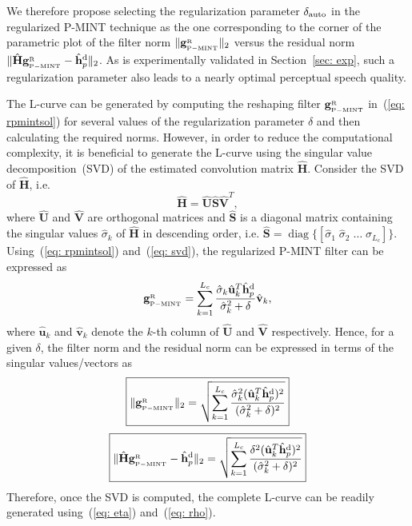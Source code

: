 \documentclass[10pt]{IEEEtran}
\DeclareMathOperator{\diag}{diag}
\begin{document}
We therefore propose selecting the regularization parameter $\delta_{\rm auto}$ in the regularized P-MINT technique as the one corresponding to the corner of the parametric plot of the filter norm $\|\mathbf{g}_{{}_{\rm P-MINT}}^{_{\rm R}}\|_2$ versus the residual norm $\|\hat{\mathbf{H}}\mathbf{g}_{{}_{\rm P-MINT}}^{_{\rm R}} - \hat{\mathbf{h}}_p^{\rm d}\|_2$.
As is experimentally validated in Section~\ref{sec: exp}, such a regularization parameter also leads to a nearly optimal perceptual speech quality.

The L-curve can be generated by computing the reshaping filter $\mathbf{g}_{{}_{\rm P-MINT}}^{_{\rm R}}$ in~(\ref{eq: rpmintsol}) for several values of the regularization parameter $\delta$ and then calculating the required norms.
However, in order to reduce the computational complexity, it is beneficial to generate the L-curve using the singular value decomposition~(SVD) of the estimated convolution matrix $\hat{\mathbf{H}}$.
Consider the SVD of $\hat{\mathbf{H}}$, i.e.
\begin{equation}
\label{eq: svd}
  \hat{\mathbf{H}} = \hat{\mathbf{U}}\hat{\mathbf{S}}\hat{\mathbf{V}}^T,
\end{equation}
where $\hat{\mathbf{U}}$ and $\hat{\mathbf{V}}$ are orthogonal matrices and $\hat{\mathbf{S}}$ is a diagonal matrix containing the singular values $\hat{\sigma}_k$ of $\hat{\mathbf{H}}$ in descending order, i.e. $\hat{\mathbf{S}} = {\diag}\{\left[\hat{\sigma}_1 \; \hat{\sigma}_2 \; \ldots \; \hat{\sigma}_{L_c}\right]\}$.
Using~(\ref{eq: rpmintsol}) and~(\ref{eq: svd}), the regularized P-MINT filter can be expressed as
\begin{equation}
\mathbf{g}_{{}_{\rm P-MINT}}^{_{\rm R}}  =  \sum_{k=1}^{L_c} \frac{\hat{\sigma}_k \hat{\mathbf{u}}_k^T \hat{\mathbf{h}}_p^{\rm d} }{\hat{\sigma}_k^2+\delta}  \hat{\mathbf{v}}_k,
\end{equation}
where $\hat{\mathbf{u}}_k$ and $\hat{\mathbf{v}}_k$ denote the $k$-th column of $\hat{\mathbf{U}}$ and $\hat{\mathbf{V}}$ respectively.
Hence, for a given $\delta$, the filter norm and the residual norm can be expressed in terms of the singular values/vectors as
\begin{equation}
\label{eq: eta}
\boxed{\|\mathbf{g}_{{}_{\rm P-MINT}}^{_{\rm R}}\|_2 = \sqrt{\sum_{k = 1}^{L_c} \frac{\hat{\sigma}_k^2 (\hat{\mathbf{u}}_k^T \hat{\mathbf{h}}_p^{\rm d})^2}{(\hat{\sigma}_k^2 + \delta)^2}}}
\end{equation}
\begin{equation}
\label{eq: rho}
\boxed{ \|\hat{\mathbf{H}}\mathbf{g}_{{}_{\rm P-MINT}}^{_{\rm R}} - \hat{\mathbf{h}}_p^{\rm d}\|_2 = \sqrt{\sum_{k = 1}^{L_c} \frac{\delta^2 (\hat{\mathbf{u}}_k^T \hat{\mathbf{h}}_p^{\rm d})^2}{(\hat{\sigma}_k^2 + \delta)^2}}}
\end{equation}
Therefore, once the SVD is computed, the complete L-curve can be readily generated using~(\ref{eq: eta}) and~(\ref{eq: rho}).
\end{document}
